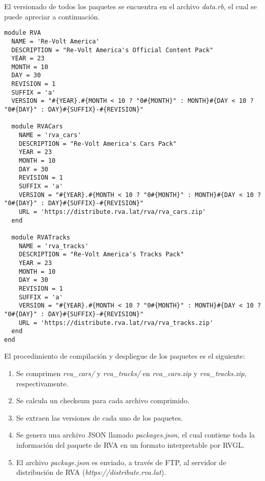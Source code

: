 \newpage

El versionado de todos los paquetes se encuentra en el archivo \textit{data.rb}, el cual se puede apreciar a continuación.

\begin{longlisting}
  \begin{verbatim}  
module RVA
  NAME = 'Re-Volt America'
  DESCRIPTION = "Re-Volt America's Official Content Pack"
  YEAR = 23
  MONTH = 10
  DAY = 30
  REVISION = 1
  SUFFIX = 'a'
  VERSION = "#{YEAR}.#{MONTH < 10 ? "0#{MONTH}" : MONTH}#{DAY < 10 ? "0#{DAY}" : DAY}#{SUFFIX}-#{REVISION}"
  
  module RVACars
    NAME = 'rva_cars'
    DESCRIPTION = "Re-Volt America's Cars Pack"
    YEAR = 23
    MONTH = 10
    DAY = 30
    REVISION = 1
    SUFFIX = 'a'
    VERSION = "#{YEAR}.#{MONTH < 10 ? "0#{MONTH}" : MONTH}#{DAY < 10 ? "0#{DAY}" : DAY}#{SUFFIX}-#{REVISION}"
    URL = 'https://distribute.rva.lat/rva/rva_cars.zip'
  end
  
  module RVATracks
    NAME = 'rva_tracks'
    DESCRIPTION = "Re-Volt America's Tracks Pack"
    YEAR = 23
    MONTH = 10
    DAY = 30
    REVISION = 1
    SUFFIX = 'a'
    VERSION = "#{YEAR}.#{MONTH < 10 ? "0#{MONTH}" : MONTH}#{DAY < 10 ? "0#{DAY}" : DAY}#{SUFFIX}-#{REVISION}"
    URL = 'https://distribute.rva.lat/rva/rva_tracks.zip'
  end
end
  \end{verbatim}
\end{longlisting}

\newpage

El procedimiento de compilación y despliegue de los paquetes es el siguiente:
\begin{enumerate}
  \item Se comprimen \textit{rva\_cars/} y \textit{rva\_tracks/} en \textit{rva\_cars.zip} y \textit{rva\_tracks.zip}, respectivamente.
  \item Se calcula un checksum para cada archivo comprimido.
  \item Se extraen las versiones de cada uno de los paquetes.
  \item Se genera una archivo JSON llamado \textit{packages.json}, el cual contiene toda la información del paquete de RVA en un formato interpretable por RVGL.
  \item El archivo \textit{package.json} es enviado, a través de FTP, al servidor de distribución de RVA (\textit{https://distribute.rva.lat}).
\end{enumerate}

